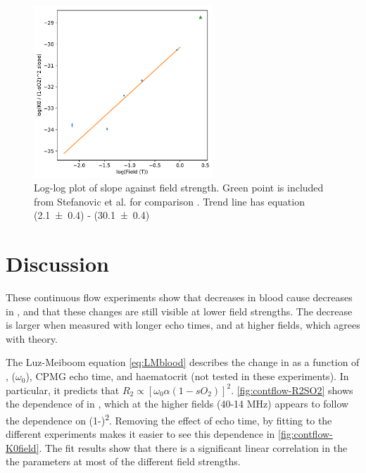 \begin{figure}[tbh]
\centering
\includegraphics[width=0.6\textwidth]{figures/contflow/k0slopefield.pdf}
\caption[\Kzero slope dependence on \Bzero]{Log-log plot of \Kzero slope against field strength. Green point is included from Stefanovic et al. for comparison \cite{StefanovicHumanwholebloodrelaxometry2004}. Trend line has equation (\num{2.1\pm0.4}) \Bzero - (\num{30.1\pm0.4})}
\label{fig:contflow-k0loglog}
\end{figure}

\section{Discussion}
These continuous flow experiments show that decreases in blood \SOtwo cause decreases in \Ttwo, and that these changes are still visible at lower field strengths.
The \Ttwo decrease is larger when measured with longer echo times, and at higher fields, which agrees with theory.

The Luz-Meiboom equation \autoref{eq:LMblood} describes the change in \Ttwo as a function of \SOtwo, \Bzero ($\omega_0$), CPMG echo time, and haematocrit (not tested in these experiments).
In particular, it predicts that $R_2 \propto \left[\omega_0\alpha(1-sO_2)\right]^2$.
\autoref{fig:contflow-R2SO2} shows the dependence of \Rtwo in \SOtwo, which at the higher fields (40-14 MHz) appears to follow the dependence on (1-\SOtwo)\textsuperscript{2}.
Removing the effect of echo time, by fitting \Kzero to the different experiments makes it easier to see this dependence in \autoref{fig:contflow-K0field}.
The fit results show that there is a significant linear correlation in the the parameters at most of the different field strengths.

